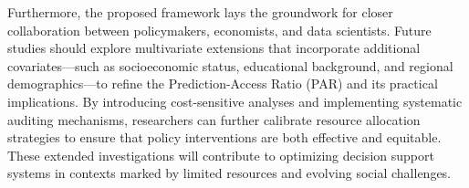\documentclass{article} %
\begin{document}
Furthermore, the proposed framework lays the groundwork for closer collaboration between policymakers, economists, and data scientists. Future studies should explore multivariate extensions that incorporate additional covariates—such as socioeconomic status, educational background, and regional demographics—to refine the Prediction-Access Ratio (PAR) and its practical implications. By introducing cost-sensitive analyses and implementing systematic auditing mechanisms, researchers can further calibrate resource allocation strategies to ensure that policy interventions are both effective and equitable. These extended investigations will contribute to optimizing decision support systems in contexts marked by limited resources and evolving social challenges.



\end{document}
